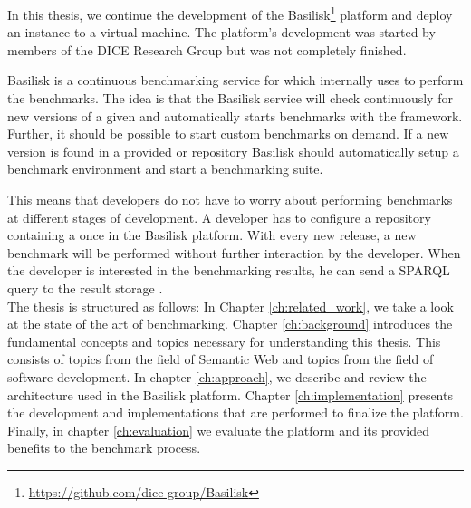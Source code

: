 In this thesis, we continue the development of the Basilisk\footnote{\url{https://github.com/dice-group/Basilisk}} platform and deploy an instance to a virtual machine.
The platform's development was started by members of the DICE Research Group but was not completely finished.

Basilisk is a continuous benchmarking service for \tsp{} which internally uses \iguana{} to perform the benchmarks.
The idea is that the Basilisk service will check continuously for new versions of a given \tsp{} and automatically starts benchmarks with the \iguana{} framework.
Further, it should be possible to start custom benchmarks on demand.
If a new version is found in a provided \gh{} or \dockh{} repository Basilisk should automatically setup a benchmark environment and start a benchmarking suite.

This means that developers do not have to worry about performing benchmarks at different stages of development.
A developer has to configure a repository containing a \ts{} once in the Basilisk platform.
With every new release, a new benchmark will be performed without further interaction by the developer.
When the developer is interested in the benchmarking results, he can send a SPARQL query to the result storage \ts{}.
\\

The thesis is structured as follows:
In Chapter \ref{ch:related_work}, we take a look at the state of the art of \ts{} benchmarking. 
Chapter \ref{ch:background} introduces the fundamental concepts and topics necessary for understanding this thesis.
This consists of topics from the field of Semantic Web and topics from the field of software development.
In chapter \ref{ch:approach}, we describe and review the architecture used in the Basilisk platform.
Chapter \ref{ch:implementation} presents the development and implementations that are performed to finalize the platform.
Finally, in chapter \ref{ch:evaluation} we evaluate the platform and its provided benefits to the \ts{} benchmark process.

